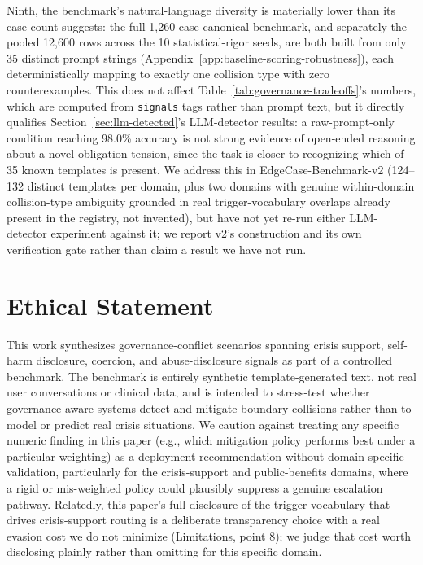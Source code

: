 \documentclass[letterpaper]{article} %
\begin{document}
Ninth, the benchmark's natural-language diversity is materially lower than its case count suggests: the full 1,260-case canonical benchmark, and separately the pooled 12,600 rows across the 10 statistical-rigor seeds, are both built from only 35 distinct prompt strings (Appendix~\ref{app:baseline-scoring-robustness}), each deterministically mapping to exactly one collision type with zero counterexamples. This does not affect Table~\ref{tab:governance-tradeoffs}'s numbers, which are computed from \texttt{signals} tags rather than prompt text, but it directly qualifies Section~\ref{sec:llm-detected}'s LLM-detector results: a raw-prompt-only condition reaching 98.0\% accuracy is not strong evidence of open-ended reasoning about a novel obligation tension, since the task is closer to recognizing which of 35 known templates is present. We address this in EdgeCase-Benchmark-v2 (124--132 distinct templates per domain, plus two domains with genuine within-domain collision-type ambiguity grounded in real trigger-vocabulary overlaps already present in the registry, not invented), but have not yet re-run either LLM-detector experiment against it; we report v2's construction and its own verification gate rather than claim a result we have not run.

\section*{Ethical Statement}
This work synthesizes governance-conflict scenarios spanning crisis support, self-harm disclosure, coercion, and abuse-disclosure signals as part of a controlled benchmark. The benchmark is entirely synthetic template-generated text, not real user conversations or clinical data, and is intended to stress-test whether governance-aware systems detect and mitigate boundary collisions rather than to model or predict real crisis situations. We caution against treating any specific numeric finding in this paper (e.g., which mitigation policy performs best under a particular weighting) as a deployment recommendation without domain-specific validation, particularly for the crisis-support and public-benefits domains, where a rigid or mis-weighted policy could plausibly suppress a genuine escalation pathway. Relatedly, this paper's full disclosure of the trigger vocabulary that drives crisis-support routing is a deliberate transparency choice with a real evasion cost we do not minimize (Limitations, point 8); we judge that cost worth disclosing plainly rather than omitting for this specific domain.
\end{document}
